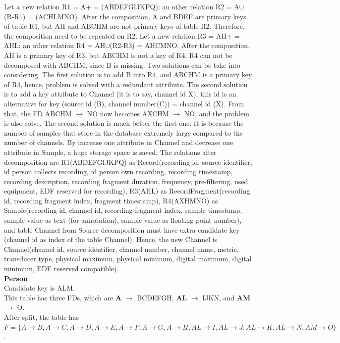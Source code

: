 Let a new relation R1 = A+ = (ABDEFGIJKPQ); an other relation R2 = A$\cup$(R-R1) = (ACHLMNO). After the composition, A and BDEF are primary keys of table R1, but AH and ABCHM are not primary keys of table R2. Therefore, the composition need to be repeated on R2. Let a new relation R3 = AH+ = AHL; an other relation R4 = AH$\cup$(R2-R3) = AHCMNO. After the composition, AH is a primary key of R3, but ABCHM is not a key of R4. R4 can not be decomposed with ABCHM, since B is missing. Two solutions can be take into considering. The first solution is to add B into R4, and ABCHM is a primary key of R4, hence, problem is solved with a redundant attribute. The second solution is to add a key attribute to Channel (it is to say, channel id X), this id is an alternative for key (source id (B), channel number(C)) = channel id (X). From that, the FD ABCHM $\rightarrow$ NO now becomes AXCHM $\rightarrow$ NO, and the problem is also solve. The second solution is much better the first one. It is because the number of samples that store in the database extremely large compared to the number of channels. By increase one attribute in Channel and decrease one attribute in Sample, a huge storage space is saved. The relations after decomposition are R1(ABDEFGIJKPQ) as Record(recording id, source identifier, id person collects recording, id person own recording, recording timestamp, recording description, recording fragment duration, frequency, pre-filtering, used equipment, EDF reserved for recording), R3(AHL) as RecordFragment(recording id, recording fragment index, fragment timestamp), R4(AXHMNO) as Sample(recording id, channel id, recording fragment index, sample timestamp, sample value as text (for annotation), sample value as floating point number), and table Channel from Source decomposition must have extra candidate key (channel id as index of the table Channel). Hence, the new Channel is Channel(channel id, source identifier, channel number, channel name, metric, transducer type, physical maximum, physical minimum, digital maximum, digital minimum, EDF reserved compatible).\\
\textbf{Person}\\
Candidate key is ALM.\\
This table has three FDs, which are \textbf{A} $\rightarrow$ BCDEFGH, \textbf{AL} $\rightarrow$ IJKN, and \textbf{AM} $\rightarrow$ O.\\
After split, the table has $F=\{A \rightarrow B, A \rightarrow C, A \rightarrow D, A \rightarrow E, A \rightarrow F, A \rightarrow G, A \rightarrow H, AL \rightarrow I, AL \rightarrow J, AL \rightarrow K, AL \rightarrow N, AM \rightarrow O\}$.
